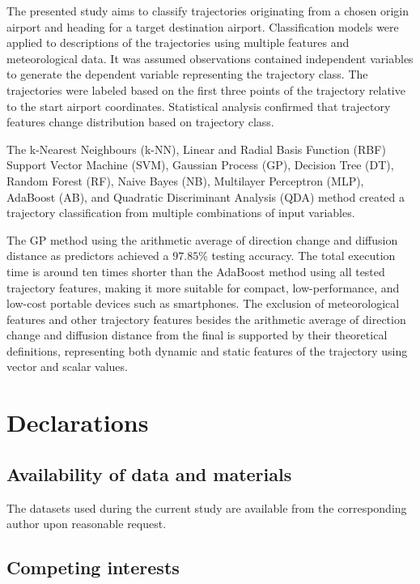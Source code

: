 \let\LaTeXcline\cline\documentclass[sn-mathphys-num]{sn-jnl}\let\cline\LaTeXcline
\begin{document}
The presented study aims to classify trajectories originating from a chosen origin airport and heading for a target destination airport. Classification models were applied to descriptions of the trajectories using multiple features and meteorological data. It was assumed observations contained independent variables to generate the dependent variable representing the trajectory class. The trajectories were labeled based on the first three points of the trajectory relative to the start airport coordinates. Statistical analysis confirmed that trajectory features change distribution based on trajectory class.

The k-Nearest Neighbours (k-NN), Linear and Radial Basis Function (RBF) Support Vector Machine (SVM), Gaussian Process (GP), Decision Tree (DT), Random Forest (RF), Naive Bayes (NB), Multilayer Perceptron (MLP), AdaBoost (AB), and Quadratic Discriminant Analysis (QDA) method created a trajectory classification from multiple combinations of input variables.

The GP method using the arithmetic average of direction change and diffusion distance as predictors achieved a $97.85\%$ testing accuracy. The total execution time is around ten times shorter than the AdaBoost method using all tested trajectory features, making it more suitable for compact, low-performance, and low-cost portable devices such as smartphones. The exclusion of meteorological features and other trajectory features besides the arithmetic average of direction change and diffusion distance from the final is supported by their theoretical definitions, representing both dynamic and static features of the trajectory using vector and scalar values.

\section{Declarations}

\subsection{Availability of data and materials}

The datasets used during the current study are available from the corresponding author upon reasonable request.

\subsection{Competing interests}
\end{document}
